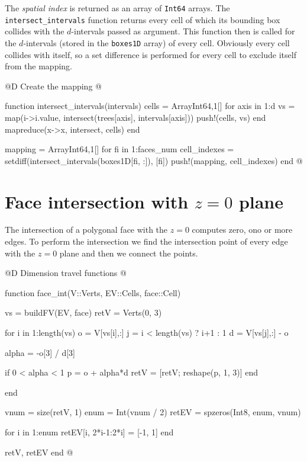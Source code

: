 The \textit{spatial index} is returned as an array of \texttt{Int64} arrays.
The \texttt{intersect\_intervals} function returns every cell of which its bounding box collides with 
the $d$-intervals passed as argument. This function then is called for the $d$-intervals (stored in the \texttt{boxes1D} array) of every cell.
Obviously every cell collides with itself, so a set difference is performed for every cell to exclude itself from the mapping.

@D Create the mapping
@{function intersect_intervals(intervals)
    cells = Array{Int64,1}[]
    for axis in 1:d
        vs = map(i->i.value, intersect(trees[axis], intervals[axis]))
        push!(cells, vs)
    end
    mapreduce(x->x, intersect, cells)
end

mapping = Array{Int64,1}[]
for fi in 1:faces_num
    cell_indexes = setdiff(intersect_intervals(boxes1D[fi, :]), [fi])
    push!(mapping, cell_indexes)
end
@}


\section{Face intersection with $z=0$ plane}

The intersection of a polygonal face with the $z=0$ computes
zero, ono or more edges. To perform the intersection we find the
intersection point of every edge with the $z=0$ plane and then
we connect the points.

@D Dimension travel functions
@{function face_int(V::Verts, EV::Cells, face::Cell)

    vs = buildFV(EV, face)
    retV = Verts(0, 3)

    for i in 1:length(vs)
        o = V[vs[i],:]
        j = i < length(vs) ? i+1 : 1
        d = V[vs[j],:] - o

        alpha = -o[3] / d[3]

        if 0 < alpha < 1
            p = o + alpha*d
            retV = [retV; reshape(p, 1, 3)]
        end

    end

    vnum = size(retV, 1)
    enum = Int(vnum / 2)
    retEV = spzeros(Int8, enum, vnum)

    for i in 1:enum
        retEV[i, 2*i-1:2*i] = [-1, 1]
    end

    retV, retEV
end
@} 

